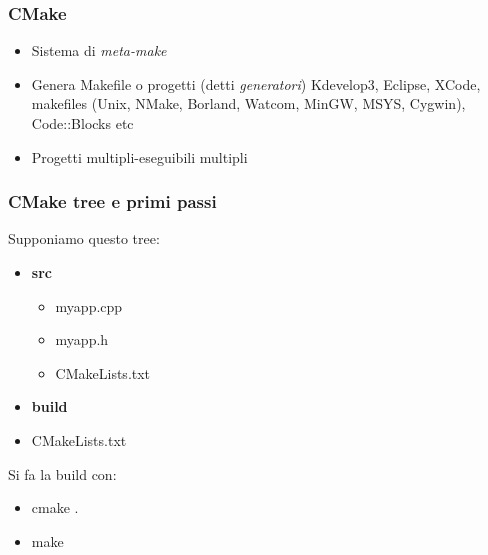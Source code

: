 \documentclass[12pt] {beamer}
\begin{document}
\begin{frame}
\frametitle{CMake}
\begin{itemize}
	\item Sistema di \emph{meta-make}
	\item Genera Makefile o progetti (detti \emph{generatori})
	Kdevelop3, Eclipse, XCode, makefiles (Unix, NMake, Borland, Watcom, MinGW, MSYS, Cygwin), Code::Blocks etc
	\item Progetti multipli-eseguibili multipli
\end{itemize}
\end{frame}

\begin{frame}
\frametitle{CMake tree e primi passi}
Supponiamo questo tree:

\begin{itemize}
\item \textbf{src}
\begin{itemize}
	\item myapp.cpp
	\item myapp.h
	\item CMakeLists.txt
\end{itemize}
\item \textbf{build}
\item CMakeLists.txt
\end{itemize}

Si fa la build con:
\begin{itemize}
	\item cmake .
	\item make
\end{itemize}
\end{frame}


\end{document}

